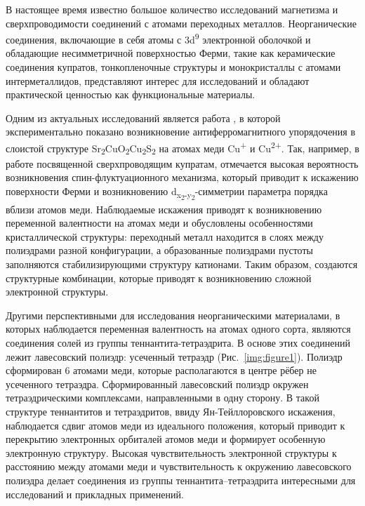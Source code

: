 {\actuality} В настоящее время известно большое количество исследований магнетизма и сверхпроводимости соединений с атомами переходных металлов\cite{Slocombe_2015}.
Неорганические соединения, включающие в себя атомы с 3d\textsuperscript{9} электронной оболочкой и обладающие несимметричной поверхностью Ферми, такие как  керамические соединения купратов, тонкопленочные структуры  и монокристаллы с атомами интерметаллидов, представляют интерес для исследований и обладают практической ценностью как функциональные материалы.

Одним из актуальных исследований является работа \cite{Blandy_2018}, в которой экспериментально показано возникновение антиферромагнитного упорядочения в слоистой структуре Sr\textsubscript{2}CuO\textsubscript{2}Cu\textsubscript{2}S\textsubscript{2} на атомах меди Cu\textsuperscript{+} и Cu\textsuperscript{2+}.
Так, например, в работе посвященной сверхпроводящим купратам\cite{Comin_2015}, отмечается высокая вероятность возникновения спин-флуктуационного механизма, который приводит к искажению поверхности Ферми и возникновению d\textsubscript{x\textsubscript{2}-y\textsubscript{2}}-симметрии параметра порядка вблизи атомов меди.
Наблюдаемые искажения приводят к возникновению переменной валентности на атомах меди и обусловлены особенностями кристаллической структуры: переходный металл находится в слоях между полиэдрами разной конфигурации, а образованные полиэдрами пустоты заполняются стабилизирующими структуру катионами.
Таким образом, создаются структурные комбинации, которые приводят к возникновению сложной электронной структуры.


Другими перспективными для исследования неорганическими материалами, в которых наблюдается переменная валентность на атомах одного сорта, являются соединения солей из группы теннантита-тетраэдрита.
В основе этих соединений лежит лавесовский полиэдр: усеченный тетраэдр (Рис.~\ref{img:figure1}).
Полиэдр сформирован 6 атомами меди, которые располагаются  в центре рёбер не усеченного тетраэдра.
Сформированный лавесовский полиэдр окружен тетраэдрическими комплексами, направленными в одну сторону.
  В такой структуре теннантитов и тетраэдритов, ввиду Ян-Тейллоровского искажения,   наблюдается сдвиг атомов меди из идеального положения, который приводит к  перекрытию электронных орбиталей атомов меди и формирует особенную электронную структуру.
Высокая чувствительность электронной структуры к расстоянию между атомами меди и чувствительность к окружению лавесовского полиэдра  делает соединения из группы теннантита--тетраэдрита  интересными для исследований и прикладных применений.


